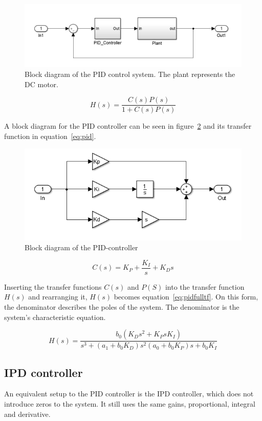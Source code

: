 \begin{figure}[!h]
	\centering
	\includegraphics[width=.75\linewidth]{graphics/controlsystem}
	\caption{Block diagram of the PID control system. The plant represents the DC motor.}
	\label{fig:pidcontrolsystem}	
\end{figure}

\begin{equation}
\label{eq:tfpidsystem}
H(s) = \dfrac{C(s)P(s)}{1+C(s)P(s)}
\end{equation}

A block diagram for the PID controller can be seen in figure~\ref{fig:pidblock} and its transfer function in equation~\ref{eq:pid}.  

\begin{figure}[!h]
	\centering
	\includegraphics[width=.7\linewidth]{graphics/pidcontroller}
	\caption{Block diagram of the PID-controller}
	\label{fig:pidblock}
\end{figure}

\begin{equation}
\label{eq:pid}
C(s) = K_P + \dfrac{K_I}{s} +K_D s
\end{equation}

Inserting the transfer functions $C(s)$ and $P(S)$ into the transfer function $H(s)$ and rearranging it, $H(s)$ becomes equation~\ref{eq:pidfulltf}. On this form, the denominator describes the poles of the system. The denominator is the system's characteristic equation.

\begin{equation}
\label{eq:pidfulltf}
H(s) = \dfrac{b_0 (K_D s^2 + K_P s K_I)}{s^3 + (a_1 + b_0 K_D)s^2 (a_0 + b_0 K_P)s + b_0 K_I }
\end{equation}


\subsection{IPD controller}
An equivalent setup to the PID controller is the IPD controller, which does not introduce zeros to the system. It still uses the same gains, proportional, integral and derivative.


